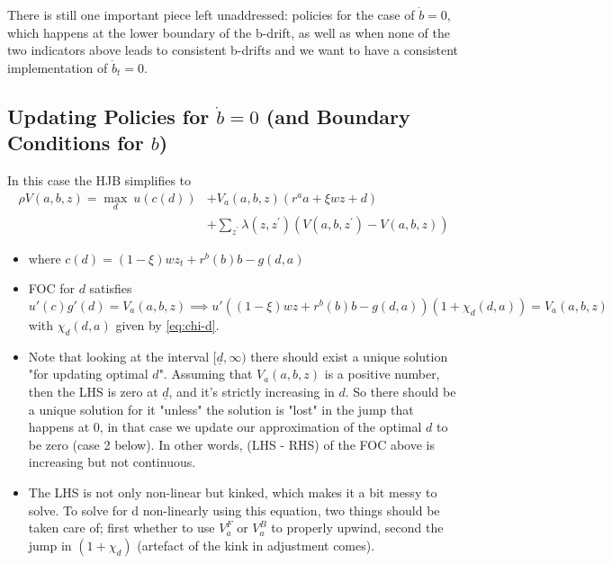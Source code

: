 \documentclass[11pt]{article}
\begin{document}
There is still one important piece left unaddressed: policies for the case of \(\dot{b} = 0\), which happens at the lower boundary of the b-drift, as well as when none of the two indicators above leads to consistent b-drifts and we want to have a consistent implementation of \(\dot{b}_t = 0\).

\subsection{Updating Policies for \(\dot{b}=0\) (and Boundary Conditions for \(b\))}
\label{sec:org0979e6c}
In this case the HJB simplifies to
\begin{align}
\label{eq:hjb-d}
\rho V(a,b,z)=\operatorname*{max}_{d}\ u(c(d))& + V_{a}(a,b,z)(r^{a}a+\xi w z+d) \nonumber \\
&+\sum_{z^{\prime}}\lambda(z,z^{\prime})(V(a,b,z^{\prime})-V(a,b,z))
\end{align}
\begin{itemize}
\item where \(c(d)=(1-\xi)w z_{t}+r^{b}(b)b-g(d,a)\)
\item FOC for \(d\) satisfies \[u'(c)g'(d) = V_a(a,b,z) \implies u'\left((1-\xi)w z+r^{b}(b)b-g(d,a) \right) \left( 1+\chi_{d}(d,a) \right) = V_a(a,b,z)\] with \(\chi_d(d,a)\) given by \eqref{eq:chi-d}.
\item Note that looking at the interval \([\underline{d}, \infty)\) there should exist a unique solution "for updating optimal \(d\)". Assuming that \(V_a(a,b,z)\) is a positive number, then the LHS is zero at \(\underline{d}\), and it's strictly increasing in \(d\). So there should be a unique solution for it "unless" the solution is "lost" in the jump that happens at 0, in that case we update our approximation of the optimal \(d\) to be zero (case 2 below). In other words, (LHS - RHS) of the FOC above is increasing but not continuous.
\item The LHS is not only non-linear but kinked, which makes it a bit messy to solve. To solve for d non-linearly using this equation, two things should be taken care of; first whether to use \(V_a^F\) or \(V_a^B\) to properly upwind, second the jump in \((1+\chi_d)\) (artefact of the kink in adjustment comes).
\end{itemize}
\end{document}
